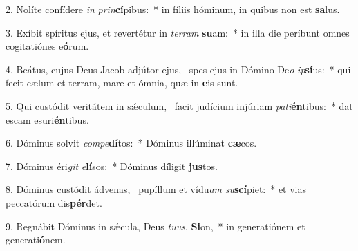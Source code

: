 2. Nolíte confídere \textit{in} \textit{prin}\textbf{cí}pibus:~*  in fíliis hóminum, in quibus non est \textbf{sa}lus.\

3. Exíbit spíritus ejus, et revertétur in \textit{ter}\textit{ram} \textbf{su}am:~*  in illa die períbunt omnes cogitatiónes e\textbf{ó}rum.\

4. Beátus, cujus Deus Jacob adjútor ejus, \dag\  spes ejus in Dómino De\textit{o} \textit{ip}\textbf{sí}us:~*  qui fecit cælum et terram, mare et ómnia, quæ in \textbf{e}is sunt.\

5. Qui custódit veritátem in sǽculum, \dag\  facit judícium injúriam \textit{pa}\textit{ti}\textbf{én}tibus:~*  dat escam esuri\textbf{én}tibus.\

6. Dóminus solvit \textit{com}\textit{pe}\textbf{dí}tos:~*  Dóminus illúminat \textbf{cæ}cos.\

7. Dóminus éri\textit{git} \textit{e}\textbf{lí}sos:~*  Dóminus díligit \textbf{jus}tos.\

8. Dóminus custódit ádvenas, \dag\  pupíllum et vídu\textit{am} \textit{su}\textbf{scí}piet:~*  et vias peccatórum dis\textbf{pér}det.\

9. Regnábit Dóminus in sǽcula, Deus \textit{tu}\textit{us}, \textbf{Si}on,~*  in generatiónem et generati\textbf{ó}nem.\

